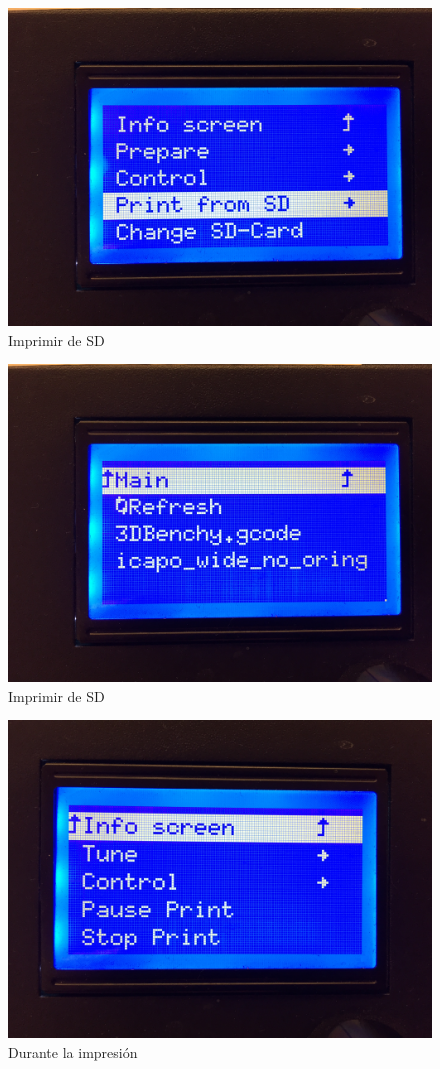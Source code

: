 \documentclass{beamer}
\begin{document}
	\begin{frame}
		\begin{figure}
			\includegraphics[height=0.6\textwidth]{images/menu_print}
			\caption{Imprimir de SD}
		\end{figure}
	\end{frame}
	\begin{frame}
		\begin{figure}
			\includegraphics[height=0.6\textwidth]{images/print_from_sd}
			\caption{Imprimir de SD}
		\end{figure}
	\end{frame}
	\begin{frame}
		\begin{figure}
			\includegraphics[height=0.6\textwidth]{images/menu_printing}
			\caption{Durante la impresión}
		\end{figure}
	\end{frame}
\end{document}
